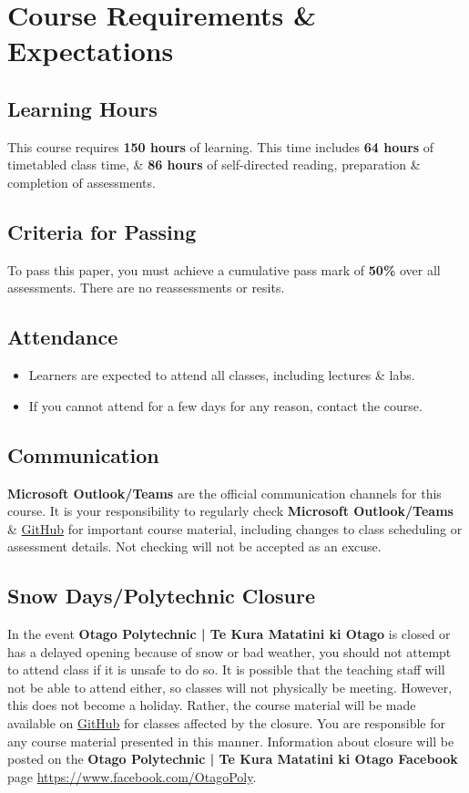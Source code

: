 \documentclass{article}
\begin{document}
\section*{Course Requirements \& Expectations}

\subsection*{Learning Hours}
This course requires \textbf{150 hours} of learning. This time includes \textbf{64 hours} of timetabled class time, \& \textbf{86 hours} of self-directed reading, preparation \& completion of assessments.  

\subsection*{Criteria for Passing}
To pass this paper, you must achieve a cumulative pass mark of \textbf{50\%} over all assessments. There are no reassessments or resits.

\subsection*{Attendance}
\begin{itemize}
	\item Learners are expected to attend all classes, including lectures \& labs.
	\item If you cannot attend for a few days for any reason, contact the course.
\end{itemize}

\subsection*{Communication}
\textbf{Microsoft Outlook/Teams} are the official communication channels for this course. It is your responsibility to regularly check \textbf{Microsoft Outlook/Teams} \& \href{https://github.com/otago-polytechnic-bit-courses/ID608001-intermediate-app-dev-concepts}{GitHub} for important course material, including changes to class scheduling or assessment details. Not checking will not be accepted as an excuse.

\subsection*{Snow Days/Polytechnic Closure}
In the event \textbf{Otago Polytechnic | Te Kura Matatini ki Otago} is closed or has a delayed opening because of snow or bad weather, you should not attempt to attend class if it is unsafe to do so. It is possible that the teaching staff will not be able to attend either, so classes will not physically be meeting. However, this does not become a holiday. Rather, the course material will be made available on \href{https://github.com/otago-polytechnic-bit-courses/ID607001-intro-app-dev-concepts}{GitHub} for classes affected by the closure. You are responsible for any course material presented in this manner. Information about closure will be posted on the \textbf{Otago Polytechnic | Te Kura Matatini ki Otago Facebook} page \href{https://www.facebook.com/OtagoPoly}{https://www.facebook.com/OtagoPoly}.
\end{document}
